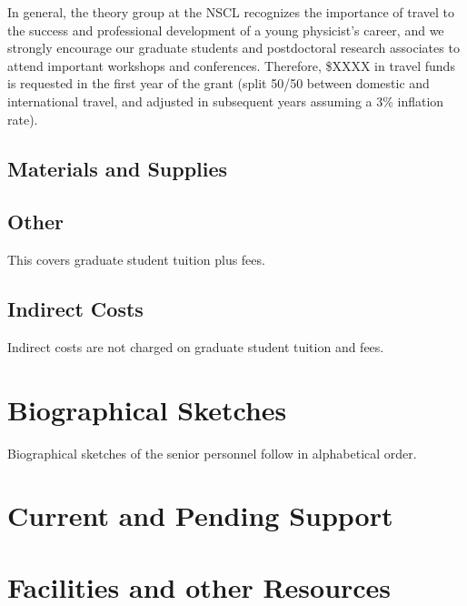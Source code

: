 \documentclass[10pt]{article}
\begin{document}
In general, the theory group at the NSCL recognizes the importance of
travel to the success and professional development of a young
physicist's career, and we strongly encourage our graduate students
and postdoctoral research associates to attend important workshops and
conferences.  Therefore, \$XXXX in travel funds is requested in the
first year of the grant (split 50/50 between domestic and
international travel, and adjusted in subsequent years assuming a 3\%
inflation rate).

\subsection{Materials and Supplies}

\subsection{Other}
This covers graduate student tuition plus fees.

\subsection{Indirect Costs}

Indirect costs are not charged on graduate student tuition and fees.




\appendix

\section{Biographical Sketches}

Biographical sketches of the senior personnel follow in alphabetical order.
%
\clearpage

\clearpage
%
\clearpage

\clearpage
%
\clearpage

\clearpage

\clearpage

\clearpage

\section{Current and Pending Support}


\section{Facilities and other Resources}
\end{document}
